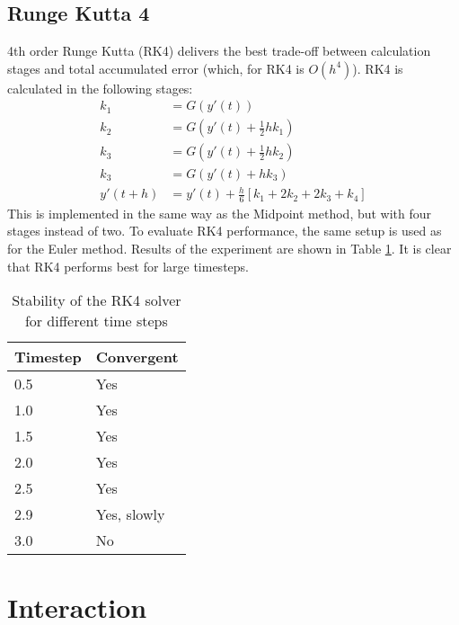 \documentclass[a4paper,twoside,11pt,twocolumn]{article}
\begin{document}
\subsection{Runge Kutta 4}
4th order Runge Kutta (RK4) delivers the best trade-off between calculation stages and total accumulated error (which, for RK4 is $O(h^4)$). RK4 is calculated in the following stages:
\begin{align}
	k_1 &= G(y'(t))\\
	k_2 &= G(y'(t)+\frac{1}{2}hk_1)\\
	k_3 &= G(y'(t)+\frac{1}{2}hk_2)\\
	k_3 &= G(y'(t)+hk_3)\\
	y'(t+h) &= y'(t) + \frac{h}{6}[k_1+2k_2+2k_3+k_4]
\end{align}
This is implemented in the same way as the Midpoint method, but with four stages instead of two.
To evaluate RK4 performance, the same setup is used as for the Euler method. Results of the experiment are shown in Table \ref{RK4}. It is clear that RK4 performs best for large timesteps.
\begin{table}[h]
	\caption{Stability of the RK4 solver for different time steps}
	\label{RK4}
	\begin{tabular}{|l|l|}
		\hline
		\textbf{Timestep} & \textbf{Convergent} \\ \hline
		0.5               & Yes                 \\ \hline
		1.0               & Yes                 \\ \hline
		1.5               & Yes                 \\ \hline
		2.0               & Yes                 \\ \hline
		2.5               & Yes                 \\ \hline
		2.9               & Yes, slowly         \\ \hline
		3.0               & No                  \\ \hline
	\end{tabular}
\end{table}

\section{Interaction}
\end{document}
